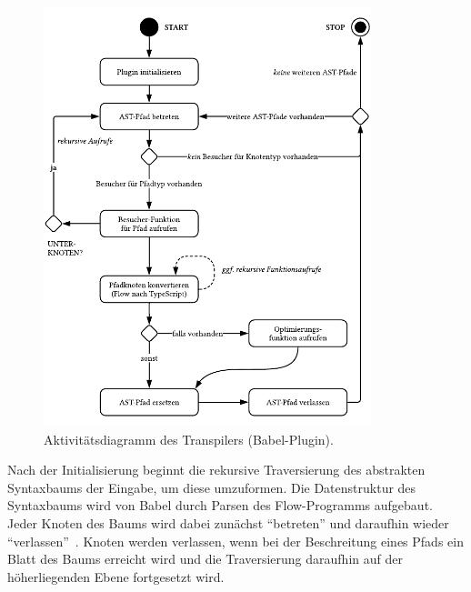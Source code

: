 \begin{figure}[p]
  \centering
  \includegraphics[width=0.85\textwidth]{src/4_Umsetzung/fig/activity-diagram-plugin.pdf}
  \caption{Aktivitätsdiagramm des Transpilers (Babel-Plugin).}
  \label{fig:activity-diagram-plugin}
\end{figure}

Nach der Initialisierung beginnt die rekursive Traversierung des abstrakten Syntaxbaums der Eingabe, um diese umzuformen. Die Datenstruktur des Syntaxbaums wird von Babel durch Parsen des Flow-Programms aufgebaut. Jeder Knoten des Baums wird dabei zunächst \enquote{betreten} und daraufhin wieder \enquote{verlassen}~\autocite{BABEL:HANDBOOK}. Knoten werden verlassen, wenn bei der Beschreitung eines Pfads ein Blatt des Baums erreicht wird und die Traversierung daraufhin auf der höherliegenden Ebene fortgesetzt wird.

